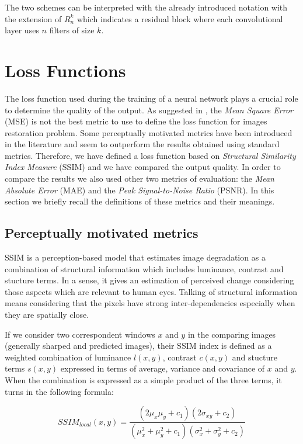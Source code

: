 \documentclass[12pt,a4paper]{report}
\begin{document}
The two schemes can be interpreted with the already introduced notation with the extension of $R_n^k$ which indicates a residual block where each convolutional layer uses $n$ filters of size $k$.

\section{Loss Functions}
The loss function used during the training of a neural network plays a crucial role to determine the quality of the output. As suggested in \cite{Z&G&F}, the \textit{Mean Square Error} (MSE) is not the best metric to use to define the loss function for images restoration problem. Some perceptually motivated metrics have been introduced in the literature and seem to outperform the results obtained using standard metrics. Therefore, we have defined a loss function based on \textit{Structural Similarity Index Measure} (SSIM) and we have compared the output quality. In order to compare the results we also used other two metrics of evaluation: the \textit{Mean Absolute Error} (MAE) and the \textit{Peak Signal-to-Noise Ratio} (PSNR). In this section we briefly recall the definitions of these metrics and their meanings. 

\subsection{Perceptually motivated metrics}
SSIM is a perception-based model that estimates image degradation as a combination of structural information which includes luminance, contrast and stucture terms. In a sense, it gives an estimation of perceived change considering those aspects which are relevant to human eyes. Talking of structural information means considering that the pixels have strong inter-dependencies especially when they are spatially close. 

If we consider two correspondent windows $x$ and $y$ in the comparing images (generally sharped and predicted images), their SSIM index is defined as a weighted combination of luminance $l(x,y)$, contrast $c(x,y)$ and stucture terms $s(x,y)$ expressed in terms of average, variance and covariance of $x$ and $y$. When the combination is expressed as a simple product of the three terms, it turns in the following formula:

\begin{equation}
SSIM_{local}(x,y) = \frac{(2\mu_x\mu_y+c_1)(2\sigma_{xy}+c_2)}{(\mu_x^2+\mu_y^2+c_1)(\sigma_x^2+\sigma_y^2+c_2)}
\end{equation}
\end{document}
